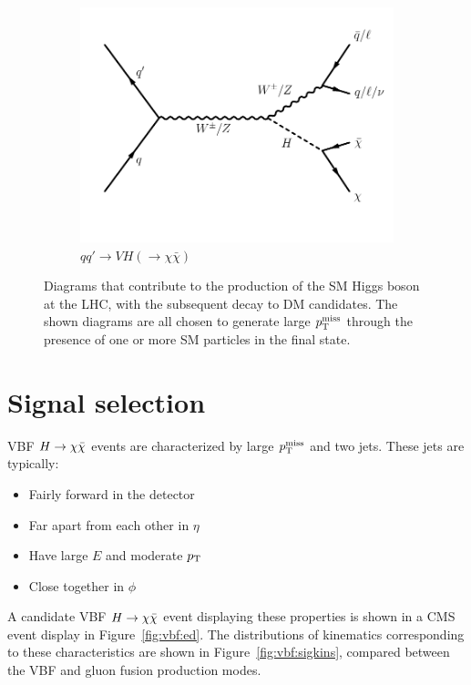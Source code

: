 \begin{figure}
\begin{center}
\begin{subfigure}[t]{0.32\textwidth}
            \includegraphics[width=\textwidth]{figures/vbf/diagrams/zh_hinv.pdf}
            \caption{$qq'\rightarrow VH(\rightarrow\chi\bar\chi)$}
        \end{subfigure}
        \caption{Diagrams that contribute to the production of the SM Higgs boson at the LHC, with the subsequent decay to DM candidates.
                 The shown diagrams are all chosen to generate large $p_\mathrm{T}^\mathrm{miss}$ through the presence of one or more SM particles in the final state.}
        \label{fig:vbf:hdiags}
    \end{center}
\end{figure}

\section{Signal selection}

VBF $H\rightarrow\chi\bar\chi$ events are characterized by large $p_\mathrm{T}^\mathrm{miss}$ and two jets.
These jets are typically:
\begin{itemize}
    \item Fairly forward in the detector
    \item Far apart from each other in $\eta$
    \item Have large $E$ and moderate $p_\mathrm{T}$
    \item Close together in $\phi$
\end{itemize}
A candidate VBF $H\rightarrow\chi\bar\chi$ event displaying these properties is shown in a CMS event display in Figure~\ref{fig:vbf:ed}.
The distributions of kinematics corresponding to these characteristics are shown in Figure~\ref{fig:vbf:sigkins}, compared between the VBF and gluon fusion production modes.

